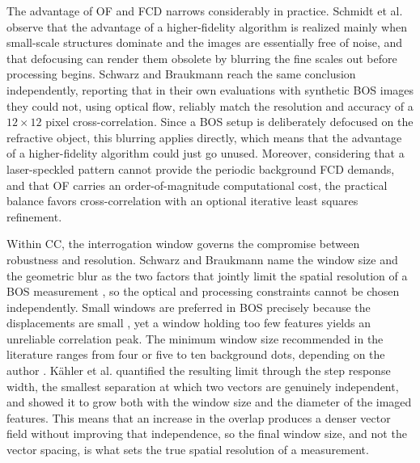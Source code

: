 \par The advantage of OF and FCD narrows considerably in practice. Schmidt et al. \cite{Schmidt2025} observe that the advantage of a higher-fidelity algorithm is realized mainly when small-scale structures dominate and the images are essentially free of noise, and that defocusing can render them obsolete by blurring the fine scales out before processing begins. Schwarz and Braukmann \cite{Schwarz&Braukmann} reach the same conclusion independently, reporting that in their own evaluations with synthetic BOS images they could not, using optical flow, reliably match the resolution and accuracy of a $12 \times 12$ pixel cross-correlation. Since a BOS setup is deliberately defocused on the refractive object, this blurring applies directly, which means that the advantage of a higher-fidelity algorithm could just go unused. Moreover, considering that a laser-speckled pattern cannot provide the periodic background FCD demands, and that OF carries an order-of-magnitude computational cost, the practical balance favors cross-correlation with an optional iterative least squares refinement.

\par Within CC, the interrogation window governs the compromise between robustness and resolution. Schwarz and Braukmann name the window size and the geometric blur as the two factors that jointly limit the spatial resolution of a BOS measurement \cite{Schwarz&Braukmann}, so the optical and processing constraints cannot be chosen independently. Small windows are preferred in BOS precisely because the displacements are small \cite{Schmidt2025}, yet a window holding too few features yields an unreliable correlation peak. The minimum window size recommended in the literature ranges from four or five to ten background dots, depending on the author \cite{Schwarz&Braukmann}. Kähler et al. \cite{KahlerEtAl} quantified the resulting limit through the step response width, the smallest separation at which two vectors are genuinely independent, and showed it to grow both with the window size and the diameter of the imaged features. This means that an increase in the overlap produces a denser vector field without improving that independence, so the final window size, and not the vector spacing, is what sets the true spatial resolution of a measurement.

